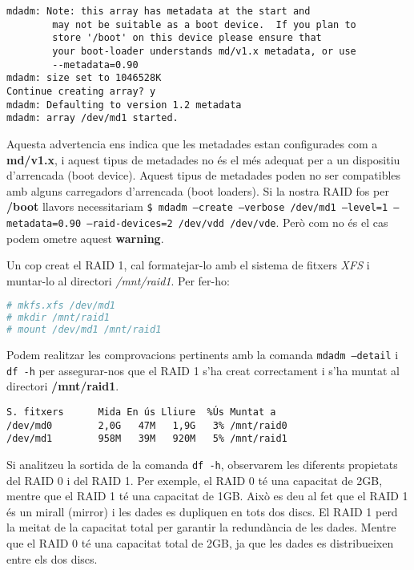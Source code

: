 \begin{terminaloutput}
\footnotesize\begin{verbatim}
mdadm: Note: this array has metadata at the start and
        may not be suitable as a boot device.  If you plan to
        store '/boot' on this device please ensure that
        your boot-loader understands md/v1.x metadata, or use
        --metadata=0.90
mdadm: size set to 1046528K
Continue creating array? y
mdadm: Defaulting to version 1.2 metadata
mdadm: array /dev/md1 started.
\end{verbatim}
\end{terminaloutput}

Aquesta advertencia ens indica que les metadades estan configurades com a \textbf{md/v1.x}, i aquest tipus de metadades no és el més adequat per a un dispositiu d'arrencada (boot device). Aquest tipus de metadades poden no ser compatibles amb alguns carregadors d'arrencada (boot loaders). Si la nostra RAID fos per \textbf{/boot} llavors necessitariam \texttt{\$ mdadm --create --verbose /dev/md1 --level=1 --metadata=0.90 --raid-devices=2 /dev/vdd /dev/vde}. Però com no és el cas podem ometre aquest \textbf{warning}.


Un cop creat el RAID 1, cal formatejar-lo amb el sistema de fitxers \emph{XFS} i muntar-lo al directori \textit{/mnt/raid1}. Per fer-ho:

\begin{lstlisting}[language=bash, numbers=none, commentstyle=\color{black}]
# mkfs.xfs /dev/md1
# mkdir /mnt/raid1
# mount /dev/md1 /mnt/raid1
\end{lstlisting}

Podem realitzar les comprovacions pertinents amb la comanda \texttt{mdadm --detail} i \texttt{df -h} per assegurar-nos que el RAID 1 s'ha creat correctament i s'ha muntat al directori \textbf{/mnt/raid1}.

\begin{terminaloutput}
\footnotesize\begin{verbatim}
S. fitxers      Mida En ús Lliure  %Ús Muntat a
/dev/md0        2,0G   47M   1,9G   3% /mnt/raid0
/dev/md1        958M   39M   920M   5% /mnt/raid1
\end{verbatim}
\end{terminaloutput}

\begin{info}
Si analitzeu la sortida de la comanda \texttt{df -h}, observarem les diferents propietats del RAID 0 i del RAID 1. Per exemple, el RAID 0 té una capacitat de 2GB, mentre que el RAID 1 té una capacitat de 1GB. Això es deu al fet que el RAID 1 és un mirall (mirror) i les dades es dupliquen en tots dos discs. El RAID 1 perd la meitat de la capacitat total per garantir la redundància de les dades. Mentre que el RAID 0 té una capacitat total de 2GB, ja que les dades es distribueixen entre els dos discs.
\end{info}


